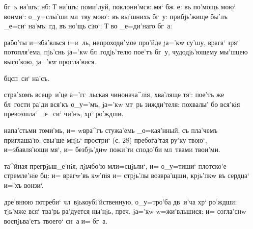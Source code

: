 
   бг~ъ на'шъ:          
нб: Т    на'шъ:  
поми'луй,      
поклони'мся:     мя` 
бж~е:    въ по'мощь мою` вонми`: 
   о_у=слы'ши мл~тву мою`: 
  въ вы'шнихъ бг~у:  
прибjь'жище бы'лъ _е=си` на'мъ:  гд, въ 
но'щь сiю`: Т  во _е=ди'наго бг~а: 


 рабо'ты и=зба'влься i=и~ль, 
непроходи'мое про'йде jа='кw су'шу, врага` зря` 
потопля'ема, пjь'снь jа='кw бл~годjь'телю пое'тъ бг~у, 
чудодjь'ющему мы'шцею высо'кою, jа='кw просла'вися.

  бц сп~си` на'съ.

 стра'хомъ всецр~и'це а='гг~льская 
чинонача^лiя, хва'ляще тя`: пое'тъ же бл~гости ра'ди 
вся'къ о_у='мъ, jа='кw мт~рь зижди'теля: похвалы' бо 
вся'кiя превозшла` _е=си` чи'нъ, хр` ро'ждши.

 напа'стьми томи'мь, и= w\т вра^гъ стужа'емь 
_о=кая'нный, съ пла'чемъ приглаша'ю: свы'ше мнjь` 
простри` (с. 28) пребога'тая ру'ку твою`, и=збавля'ющи 
мя`, и= безбjь'днw пожи'ти сподо'би мл~твами твои'ми.

  та^йная прегрjьш_е'нiя, лjьчбо'ю 
мл и=сцjьли`, и= о_у=тиши` плотско'е стремле'нiе 
бц: и= врагw'въ кw'пiя и= стрjь'лы возвра'щши, 
крjь'пкw въ сердца` и='хъ вонзи`.

   дре'внюю потреби` 
чл~вjькоубi'йственную, о_у=тро'ба дв~и'ча хр` 
ро'ждши: тjь'мже вся` тва'рь ра'дуется ны'нjь, преч, 
jа='кw w=жи'вльшися: и= согла'снw воспjьва'етъ твоего` 
сн~а и= бг~а.

